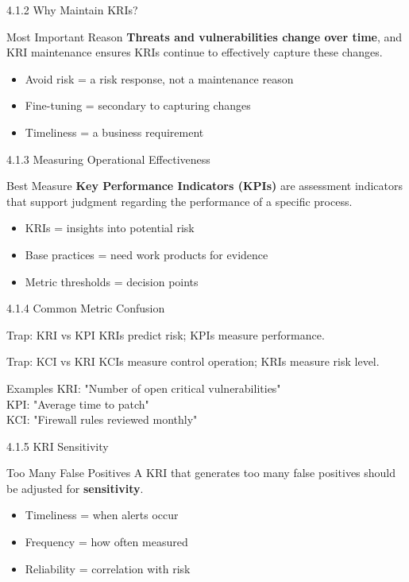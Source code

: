 \documentclass{beamer}
\begin{document}
	\begin{frame}{4.1.2 Why Maintain KRIs?}
		\begin{block}{Most Important Reason}
			\textbf{Threats and vulnerabilities change over time}, and KRI maintenance ensures KRIs continue to effectively capture these changes.
		\end{block}
		\begin{itemize}
			\item Avoid risk = a risk response, not a maintenance reason
			\item Fine-tuning = secondary to capturing changes
			\item Timeliness = a business requirement
		\end{itemize}
	\end{frame}
	
	\begin{frame}{4.1.3 Measuring Operational Effectiveness}
		\begin{block}{Best Measure}
			\textbf{Key Performance Indicators (KPIs)} are assessment indicators that support judgment regarding the performance of a specific process.
		\end{block}
		\begin{itemize}
			\item KRIs = insights into potential risk
			\item Base practices = need work products for evidence
			\item Metric thresholds = decision points
		\end{itemize}
	\end{frame}
	
	\begin{frame}{4.1.4 Common Metric Confusion}
		\begin{block}{Trap: KRI vs KPI}
			KRIs predict risk; KPIs measure performance.
		\end{block}
		\begin{block}{Trap: KCI vs KRI}
			KCIs measure control operation; KRIs measure risk level.
		\end{block}
		\begin{exampleblock}{Examples}
			KRI: "Number of open critical vulnerabilities" \\
			KPI: "Average time to patch" \\
			KCI: "Firewall rules reviewed monthly"
		\end{exampleblock}
	\end{frame}
	
	\begin{frame}{4.1.5 KRI Sensitivity}
		\begin{block}{Too Many False Positives}
			A KRI that generates too many false positives should be adjusted for \textbf{sensitivity}.
		\end{block}
		\begin{itemize}
			\item Timeliness = when alerts occur
			\item Frequency = how often measured
			\item Reliability = correlation with risk
		\end{itemize}
	\end{frame}
	
\end{document}
